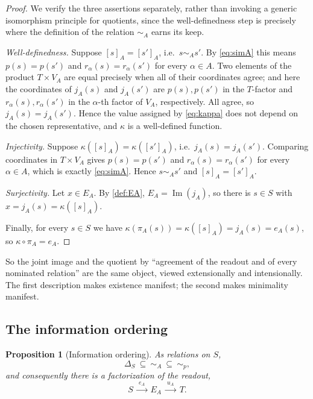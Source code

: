 \documentclass[11pt,reqno]{amsart}
\theoremstyle{plain}
\newtheorem{proposition}[theorem]{Proposition}
\theoremstyle{definition}
\theoremstyle{remark}
\numberwithin{equation}{section}
\DeclareMathOperator{\Image}{Im}
\begin{document}
\begin{proof}
We verify the three assertions separately, rather than invoking a generic isomorphism
principle for quotients, since the well-definedness step is precisely where the definition
of the relation $\sim_A$ earns its keep.

\emph{Well-definedness.} Suppose $[s]_A=[s']_A$, i.e.\ $s\sim_A s'$. By \eqref{eq:simA} this means
$p(s)=p(s')$ and $r_\alpha(s)=r_\alpha(s')$ for every $\alpha\in A$. Two elements of the product
$T\times V_A$ are equal precisely when all of their coordinates agree; and here the coordinates of
$j_A(s)$ and $j_A(s')$ are $p(s),p(s')$ in the $T$-factor and $r_\alpha(s),r_\alpha(s')$ in the
$\alpha$-th factor of $V_A$, respectively. All agree, so $j_A(s)=j_A(s')$. Hence the value assigned
by \eqref{eq:kappa} does not depend on the chosen representative, and $\kappa$ is a well-defined
function.

\emph{Injectivity.} Suppose $\kappa([s]_A)=\kappa([s']_A)$, i.e.\ $j_A(s)=j_A(s')$. Comparing
coordinates in $T\times V_A$ gives $p(s)=p(s')$ and $r_\alpha(s)=r_\alpha(s')$ for every $\alpha\in
A$, which is exactly \eqref{eq:simA}. Hence $s\sim_A s'$ and $[s]_A=[s']_A$.

\emph{Surjectivity.} Let $x\in E_A$. By \cref{def:EA}, $E_A=\Image(j_A)$, so there is $s\in S$ with
$x=j_A(s)=\kappa([s]_A)$.

Finally, for every $s\in S$ we have $\kappa(\pi_A(s))=\kappa([s]_A)=j_A(s)=e_A(s)$, so
$\kappa\circ\pi_A=e_A$.
\end{proof}

So the joint image and the quotient by ``agreement of the readout and of every nominated relation''
are the same object, viewed extensionally and intensionally. The first description makes existence
manifest; the second makes minimality manifest.

\subsection{The information ordering}

\begin{proposition}[Information ordering]
\label{prop:ordering}
As relations on $S$,
\begin{equation}
\label{eq:ordering}
\Delta_S\ \subseteq\ \sim_A\ \subseteq\ \sim_p ,
\end{equation}
and consequently there is a factorization of the readout,
\begin{equation}
\label{eq:tower}
S\ \xrightarrow{\ e_A\ }\ E_A\ \xrightarrow{\ u_A\ }\ T .
\end{equation}
\end{proposition}
\end{document}
